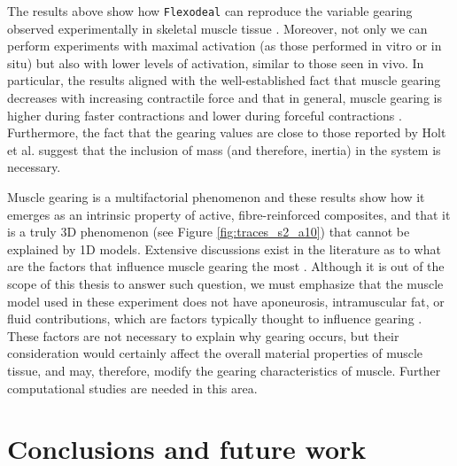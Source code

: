 \documentclass{sfuthesis}
\numberwithin{equation}{section}
\numberwithin{figure}{chapter}
\numberwithin{table}{chapter}
\theoremstyle{definition}
\begin{document}
The results above show how \texttt{Flexodeal} can reproduce the variable gearing observed experimentally in skeletal muscle tissue \cite{Azizi2008VariableGearing}. Moreover, not only we can perform experiments with maximal activation (as those performed in vitro or in situ) but also with lower levels of activation, similar to those seen in vivo. In particular, the results aligned with the well-established fact that muscle gearing decreases with increasing contractile force \cite{Eng2018} and that in general, muscle gearing is higher during faster contractions and lower during forceful contractions \cite{Azizi2008VariableGearing,Eng2018,Holt2016,RobertsEtAl2019MutiScale3DNature}. Furthermore, the fact that the gearing values are close to those reported by Holt et al. \cite{Holt2016} suggest that the inclusion of mass (and therefore, inertia) in the system is necessary.

Muscle gearing is a multifactorial phenomenon and these results show how it emerges as an intrinsic property of active, fibre-reinforced composites, and that it is a truly 3D phenomenon (see Figure \ref{fig:traces_s2_a10}) that cannot be explained by 1D models. Extensive discussions exist in the literature as to what are the factors that influence muscle gearing the most \cite{Eng2018}.
Although it is out of the scope of this thesis to answer such question, we must emphasize that the muscle model used in these experiment does not have aponeurosis, intramuscular fat, or fluid contributions, which are factors typically thought to influence gearing \cite{AziziGillisBrainerd2002,BrainerdAzizi2005,Eng2018,Holt2016}. These factors are not necessary to explain why gearing occurs, but their consideration would certainly affect the overall material properties of muscle tissue, and may, therefore, modify the gearing characteristics of muscle. Further computational studies are needed in this area.


\chapter{Conclusions and future work}


%
%
%
%
%
\end{document}

